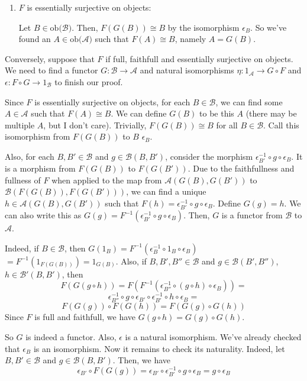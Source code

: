 \documentclass{article}
\theoremstyle{definition}
\newcommand{\cat}[1]{\mathscr{#1}}
\newcommand{\catobj}[1]{\text{ob(}\cat{#1}\text{)}}
\newcommand{\catmor}[3]{\cat{#1}(#2, #3)}
\begin{document}
{\begin{enumerate}
        \item $F$ is essentially surjective on objects:

              Let $B \in \catobj{B}$. Then, $F(G(B)) \cong B$ by the isomorphism $\epsilon_B$. So we've found an $A \in \catobj{A}$ such that $F(A) \cong B$, namely $A=G(B)$.


    \end{enumerate}

    Conversely, suppose that $F$ if full, faithfull and essentially surjective on objects. We need to find a functor $G : \cat{B} \to \cat{A}$ and natural isomorphisms $\eta : 1_{\cat{A}} \to G \circ F$ and $\epsilon : F \circ G \to 1_{\cat{B}}$ to finish our proof.

    Since $F$ is essentially surjective on objects, for each $B \in \cat{B}$, we can find some $A \in \cat{A}$ such that $F(A) \cong B$. We can define $G(B)$ to be this $A$ (there may be multiple $A$, but I don't care). Trivially, $F(G(B)) \cong B$ for all $B \in \cat{B}$. Call this isomorphism from $F(G(B))$ to $B$ $\epsilon_B$.

    Also, for each $B, B' \in \cat{B}$ and $g \in \catmor{B}{B}{B'}$, consider the morphism $\epsilon_{B'}^{-1} \circ g \circ \epsilon_B$. It is a morphism from $F(G(B))$ to $F(G(B'))$. Due to the faithfullness and fullness of $F$ when applied to the map from $\catmor{A}{G(B)}{G(B')}$ to $\catmor{B}{F(G(B))}{F(G(B'))}$, we can find a unique $h \in \catmor{A}{G(B)}{G(B')}$ such that $F(h) = \epsilon_{B'}^{-1} \circ g \circ \epsilon_B$. Define $G(g) = h$. We can also write this as $G(g) = F^{-1}(\epsilon_{B'}^{-1} \circ g \circ \epsilon_B)$. Then, $G$ is a functor from $\cat{B}$ to $\cat{A}$.

    Indeed, if $B \in \cat{B}$, then $G(1_B) = F^{-1}(\epsilon_B^{-1} \circ 1_B \circ \epsilon_B)$ $= F^{-1}(1_{F(G(B))}) = 1_{G(B)}$.
    Also, if $B, B', B'' \in \cat{B}$ and $g \in \catmor{B}{B'}{B''}$, $h \in \catmor{B'}{B}{B'}$, then
    $$F(G(g \circ h)) = F(F^{-1}(\epsilon_{B''}^{-1} \circ (g \circ h) \circ \epsilon_B)) = $$
    $$\epsilon_{B''}^{-1} \circ g \circ \epsilon_{B'} \circ \epsilon_{B'}^{-1} \circ h \circ \epsilon_B = $$
    $$ F(G(g)) \circ F(G(h)) = F(G(g) \circ G(h))$$
    Since $F$ is full and faithfull, we have $G(g \circ h) = G(g) \circ G(h)$.

    So $G$ is indeed a functor. Also, $\epsilon$ is a natural isomorphism. We've already checked that $\epsilon_B$ is an isomorphism. Now it remains to check its naturality. Indeed, let $B, B' \in \cat{B}$ and $g \in \catmor{B}{B}{B'}$. Then, we have
    $$ \epsilon_{B'} \circ F(G(g)) = \epsilon_{B'} \circ \epsilon_{B'}^{-1} \circ g \circ \epsilon_B = g \circ \epsilon_B$$

}
\end{document}
